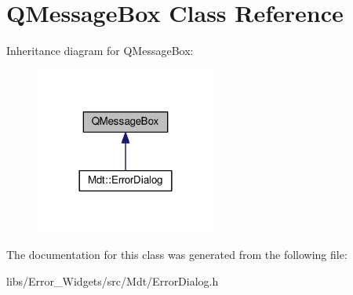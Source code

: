 \hypertarget{class_q_message_box}{}\section{Q\+Message\+Box Class Reference}
\label{class_q_message_box}


Inheritance diagram for Q\+Message\+Box\+:\nopagebreak
\begin{figure}[H]
\begin{center}
\leavevmode
\includegraphics[width=168pt]{class_q_message_box__inherit__graph}
\end{center}
\end{figure}


The documentation for this class was generated from the following file\+:\begin{DoxyCompactItemize}
\item 
libs/\+Error\+\_\+\+Widgets/src/\+Mdt/Error\+Dialog.\+h\end{DoxyCompactItemize}

